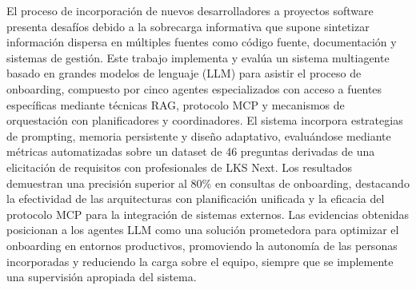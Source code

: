 El proceso de incorporación de nuevos desarrolladores a proyectos software presenta desafíos debido a la sobrecarga informativa que supone sintetizar información dispersa en múltiples fuentes como código fuente, documentación y sistemas de gestión. Este trabajo implementa y evalúa un sistema multiagente basado en grandes modelos de lenguaje (LLM) para asistir el proceso de onboarding, compuesto por cinco agentes especializados con acceso a fuentes específicas mediante técnicas RAG, protocolo MCP y mecanismos de orquestación con planificadores y coordinadores. El sistema incorpora estrategias de prompting, memoria persistente y diseño adaptativo, evaluándose mediante métricas automatizadas sobre un dataset de 46 preguntas derivadas de una elicitación de requisitos con profesionales de LKS Next. Los resultados demuestran una precisión superior al 80\% en consultas de onboarding, destacando la efectividad de las arquitecturas con planificación unificada y la eficacia del protocolo MCP para la integración de sistemas externos. Las evidencias obtenidas posicionan a los agentes LLM como una solución prometedora para optimizar el onboarding en entornos productivos, promoviendo la autonomía de las personas incorporadas y reduciendo la carga sobre el equipo, siempre que se implemente una supervisión apropiada del sistema.

